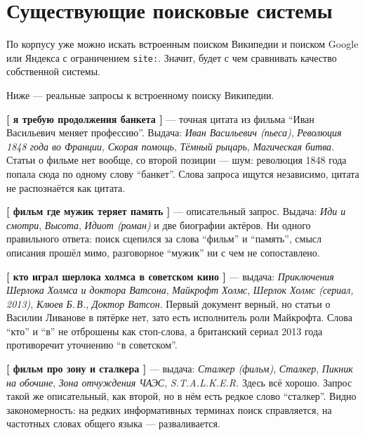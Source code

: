 \section{Существующие поисковые системы}

По корпусу уже можно искать встроенным поиском Википедии и поиском Google или Яндекса с
ограничением \texttt{site:}. Значит, будет с чем сравнивать качество собственной системы.

Ниже --- реальные запросы к встроенному поиску Википедии.

\textbf{[ я требую продолжения банкета ]} --- точная цитата из фильма \enquote{Иван
Васильевич меняет профессию}. Выдача: \emph{Иван Васильевич (пьеса)}, \emph{Революция
1848 года во Франции}, \emph{Скорая помощь}, \emph{Тёмный рыцарь}, \emph{Магическая
битва}. Статьи о фильме нет вообще, со второй позиции --- шум: революция 1848 года
попала сюда по одному слову \enquote{банкет}. Слова запроса ищутся независимо, цитата
не распознаётся как цитата.

\textbf{[ фильм где мужик теряет память ]} --- описательный запрос. Выдача: \emph{Иди и
смотри}, \emph{Высота}, \emph{Идиот (роман)} и две биографии актёров. Ни одного
правильного ответа: поиск сцепился за слова \enquote{фильм} и \enquote{память}, смысл
описания прошёл мимо, разговорное \enquote{мужик} ни с чем не сопоставлено.

\textbf{[ кто играл шерлока холмса в советском кино ]} --- выдача: \emph{Приключения
Шерлока Холмса и доктора Ватсона}, \emph{Майкрофт Холмс}, \emph{Шерлок Холмс (сериал,
2013)}, \emph{Клюев Б.\,В.}, \emph{Доктор Ватсон}. Первый документ верный, но статьи о
Василии Ливанове в пятёрке нет, зато есть исполнитель роли Майкрофта. Слова \enquote{кто}
и \enquote{в} не отброшены как стоп-слова, а британский сериал 2013 года противоречит
уточнению \enquote{в советском}.

\textbf{[ фильм про зону и сталкера ]} --- выдача: \emph{Сталкер (фильм)},
\emph{Сталкер}, \emph{Пикник на обочине}, \emph{Зона отчуждения ЧАЭС},
\emph{S.T.A.L.K.E.R.} Здесь всё хорошо. Запрос такой же описательный, как второй, но в
нём есть редкое слово \enquote{сталкер}. Видно закономерность: на редких информативных
терминах поиск справляется, на частотных словах общего языка --- разваливается.

\pagebreak
